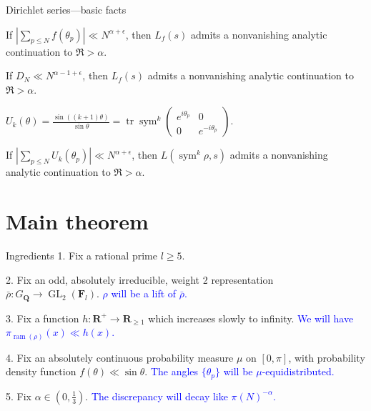 \documentclass{beamer}
\DeclareMathOperator{\GL}{GL}
\DeclareMathOperator{\ram}{ram}
\DeclareMathOperator{\sym}{sym}
\DeclareMathOperator{\tr}{tr}
\newcommand{\bF}{\mathbf{F}}
\newcommand{\bQ}{\mathbf{Q}}
\newcommand{\bR}{\mathbf{R}}
\begin{document}
\begin{frame}{Dirichlet series---basic facts}
\begin{theorem}[M.]
If $\left| \sum_{p\leqslant N} f(\theta_p)\right| \ll N^{\alpha+\epsilon}$, 
then $L_f(s)$ admits a nonvanishing analytic continuation to $\Re > \alpha$. 
\end{theorem}
\pause

\begin{corollary}
If $D_N \ll N^{\alpha-1+\epsilon}$, then $L_f(s)$ admits a nonvanishing 
analytic continuation to $\Re > \alpha$. 
\end{corollary}
\pause

\begin{definition}
$U_k(\theta) = \frac{\sin((k+1)\theta)}{\sin\theta} = \tr\sym^k \left(\begin{smallmatrix} e^{i \theta_p} & 0\\ 0 & e^{-i \theta_p}\end{smallmatrix}\right)$.
\end{definition}
\pause

\begin{theorem}
If $\left| \sum_{p\leqslant N} U_k(\theta_p)\right| \ll N^{\alpha+\epsilon}$, 
then $L(\sym^k\rho, s)$ admits a nonvanishing analytic continuation to 
$\Re > \alpha$. 
\end{theorem}
\end{frame}





\section{Main theorem}

\begin{frame}{Ingredients}
1. Fix a rational prime $l\geqslant 5$. 
\pause

2. Fix an odd, absolutely irreducible, weight 2 representation 
$\bar\rho\colon G_\bQ \to \GL_2(\bF_l)$.
\pause
\textcolor{blue}{$\rho$ will be a lift of $\bar\rho$.}
\pause

3. Fix a function $h\colon \bR^+ \to \bR_{\geqslant 1}$ which increases slowly 
to infinity. 
\pause
\textcolor{blue}{We will have $\pi_{\ram(\rho)}(x) \ll h(x)$.}
\pause

4. Fix an absolutely continuous probability measure $\mu$ on $[0,\pi]$, with 
probability density function $f(\theta)\ll \sin\theta$.
\pause
\textcolor{blue}{The angles $\{\theta_p\}$ will be $\mu$-equidistributed.}
\pause

5. Fix $\alpha\in \left(0,\frac 1 3\right)$. 
\pause
\textcolor{blue}{The discrepancy will decay like $\pi(N)^{-\alpha}$.}
\end{frame}
\end{document}
